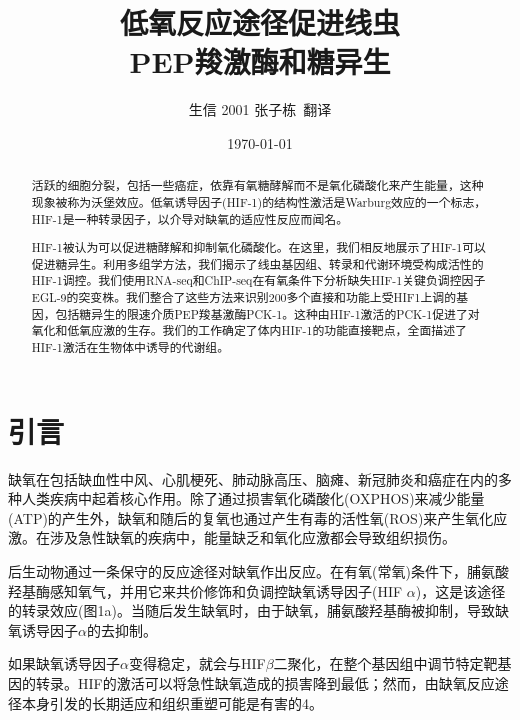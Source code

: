 \documentclass{ctexart}
\title{低氧反应途径促进线虫\\PEP羧激酶和糖异生}
\author{生信 2001 张子栋\ 翻译}
\date{\today}
\begin{document}
    \thispagestyle{empty}
    \maketitle

    \clearpage

    \thispagestyle{empty}

    \begin{abstract}
        活跃的细胞分裂，包括一些癌症，依靠有氧糖酵解而不是氧化磷酸化来产生能量，这种现象被称为沃堡效应。低氧诱导因子(HIF-1)的结构性激活是Warburg效应的一个标志，HIF-1是一种转录因子，以介导对缺氧的适应性反应而闻名。

        HIF-1被认为可以促进糖酵解和抑制氧化磷酸化。在这里，我们相反地展示了HIF-1可以促进糖异生。利用多组学方法，我们揭示了线虫基因组、转录和代谢环境受构成活性的HIF-1调控。我们使用RNA-seq和ChIP-seq在有氧条件下分析缺失HIF-1关键负调控因子EGL-9的突变株。我们整合了这些方法来识别200多个直接和功能上受HIF1上调的基因，包括糖异生的限速介质PEP羧基激酶PCK-1。这种由HIF-1激活的PCK-1促进了对氧化和低氧应激的生存。我们的工作确定了体内HIF-1的功能直接靶点，全面描述了HIF-1激活在生物体中诱导的代谢组。
    \end{abstract}

    \clearpage

    \tableofcontents
    
    \setcounter{page}{0}

    \thispagestyle{empty}

    \clearpage

    \section{引言}

    缺氧在包括缺血性中风、心肌梗死、肺动脉高压、脑瘫、新冠肺炎和癌症在内的多种人类疾病中起着核心作用。除了通过损害氧化磷酸化(OXPHOS)来减少能量(ATP)的产生外，缺氧和随后的复氧也通过产生有毒的活性氧(ROS)来产生氧化应激。在涉及急性缺氧的疾病中，能量缺乏和氧化应激都会导致组织损伤。

    后生动物通过一条保守的反应途径对缺氧作出反应。在有氧(常氧)条件下，脯氨酸羟基酶感知氧气，并用它来共价修饰和负调控缺氧诱导因子(HIF $\alpha$)，这是该途径的转录效应(图1a)。当随后发生缺氧时，由于缺氧，脯氨酸羟基酶被抑制，导致缺氧诱导因子$\alpha$的去抑制。

    如果缺氧诱导因子$\alpha$变得稳定，就会与HIF$\beta$二聚化，在整个基因组中调节特定靶基因的转录。HIF的激活可以将急性缺氧造成的损害降到最低；然而，由缺氧反应途径本身引发的长期适应和组织重塑可能是有害的4。
\end{document}
